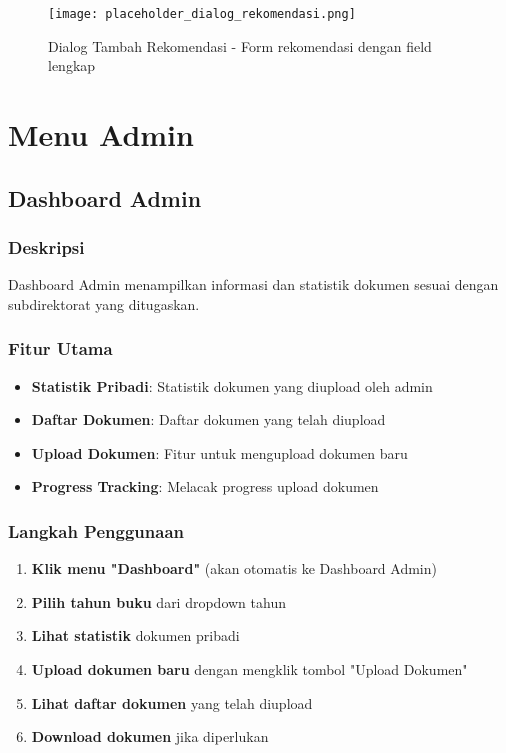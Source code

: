 \documentclass[12pt,a4paper]{article}
\begin{document}
\begin{figure}[H]
    \centering
    \texttt{[image: placeholder\_dialog\_rekomendasi.png]}
    \caption{Dialog Tambah Rekomendasi - Form rekomendasi dengan field lengkap}
    \label{fig:dialog_rekomendasi}
\end{figure}

\newpage

\section{Menu Admin}

\subsection{Dashboard Admin}

\subsubsection{Deskripsi}
Dashboard Admin menampilkan informasi dan statistik dokumen sesuai dengan subdirektorat yang ditugaskan.

\subsubsection{Fitur Utama}
\begin{itemize}
    \item \textbf{Statistik Pribadi}: Statistik dokumen yang diupload oleh admin
    \item \textbf{Daftar Dokumen}: Daftar dokumen yang telah diupload
    \item \textbf{Upload Dokumen}: Fitur untuk mengupload dokumen baru
    \item \textbf{Progress Tracking}: Melacak progress upload dokumen
\end{itemize}

\subsubsection{Langkah Penggunaan}
\begin{enumerate}
    \item \textbf{Klik menu "Dashboard"} (akan otomatis ke Dashboard Admin)
    \item \textbf{Pilih tahun buku} dari dropdown tahun
    \item \textbf{Lihat statistik} dokumen pribadi
    \item \textbf{Upload dokumen baru} dengan mengklik tombol "Upload Dokumen"
    \item \textbf{Lihat daftar dokumen} yang telah diupload
    \item \textbf{Download dokumen} jika diperlukan
\end{enumerate}
\end{document}
